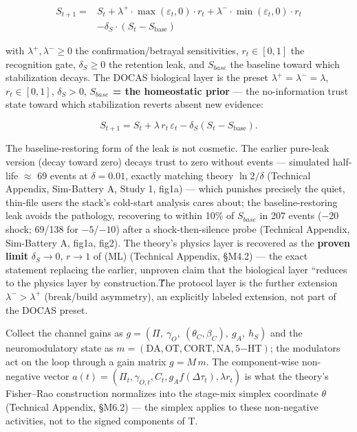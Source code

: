 \documentclass[11pt,twocolumn]{article}
\theoremstyle{plain}
\begin{document}
\begin{equation}
\begin{split}
S_{t+1} = {}& S_t + \lambda^{+}\!\cdot\max(\varepsilon_t, 0)\cdot r_t + \lambda^{-}\!\cdot\min(\varepsilon_t, 0)\cdot r_t\\
&- \delta_S\cdot(S_t - S_{\mathrm{base}})
\end{split}
\tag{ML}\label{eq:ml}
\end{equation}

with $\lambda^{+}, \lambda^{-} \geq 0$ the confirmation/betrayal sensitivities, $r_t \in [0,1]$ the recognition gate, $\delta_S \geq 0$ the retention leak, and $S_{base}$ the baseline toward which stabilization decays. The DOCAS biological layer is the preset $\lambda^{+} = \lambda^{-} = \lambda$, $r_t \in [0,1]$, $\delta_S > 0$, \textbf{$S_{base}$ = the homeostatic prior} — the no-information trust state toward which stabilization reverts absent new evidence:

\begin{equation}
S_{t+1} = S_t + \lambda\, r_t\, \varepsilon_t - \delta_S (S_t - S_{\mathrm{base}}).
\tag{DOCAS preset}\label{eq:preset}
\end{equation}

The baseline-restoring form of the leak is not cosmetic. The earlier pure-leak version (decay toward zero) decays trust to zero without events — simulated half-life $\approx$ 69 events at $\delta = 0.01$, exactly matching theory $\ln 2/\delta$ (Technical Appendix, Sim-Battery A, Study 1, fig1a) — which punishes precisely the quiet, thin-file users the stack's cold-start analysis cares about; the baseline-restoring leak avoids the pathology, recovering to within 10\% of $S_{base}$ in 207 events ($-20$ shock; 69/138 for $-5$/$-10$) after a shock-then-silence probe (Technical Appendix, Sim-Battery A, fig1a, fig2). The theory's physics layer is recovered as the \textbf{proven limit} $\delta_S \to 0$, $r \to 1$ of (ML) (Technical Appendix, \S{}M4.2) — the exact statement replacing the earlier, unproven claim that the biological layer ``reduces to the physics layer by construction.\'\' The protocol layer is the further extension $\lambda^{-} > \lambda^{+}$ (break/build asymmetry), an explicitly labeled extension, not part of the DOCAS preset.

Collect the channel gains as $g = (\Pi,\ \gamma_O,\ (\theta_C, \beta_C),\ g_A,\ h_S)$ and the neuromodulatory state as $m = (\mathrm{DA}, \mathrm{OT}, \mathrm{CORT}, \mathrm{NA}, \mathrm{5\mathord{-}HT})$; the modulators act on the loop through a gain matrix $g = M\,m$. The component-wise non-negative vector $a(t) = (\Pi_t, \gamma_{O,t}, C_t, g_A f(\Delta\tau_t), \lambda r_t)$ is what the theory's Fisher–Rao construction normalizes into the stage-mix simplex coordinate $\theta$ (Technical Appendix, \S{}M6.2) — the simplex applies to these non-negative activities, not to the signed components of T.
\end{document}
